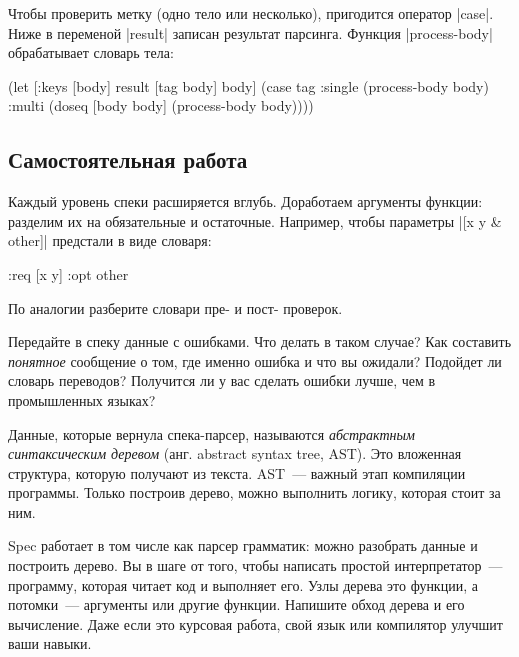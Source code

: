 Чтобы проверить метку (одно тело или несколько), пригодится оператор
\spverb|case|. Ниже в переменой \spverb|result| записан результат
парсинга. Функция \spverb|process-body| обрабатывает словарь тела:

\begin{english}
  \begin{clojure}
(let [{:keys [body]} result
      [tag body] body]
  (case tag
    :single
    (process-body body)
    :multi
    (doseq [body body]
      (process-body body))))
  \end{clojure}
\end{english}

\subsection{Самостоятельная работа}


Каждый уровень спеки расширяется вглубь. Доработаем аргументы функции: разделим
их на обязательные и остаточные. Например, чтобы параметры \spverb|[x y & other]|
предстали в виде словаря:

\begin{english}
  \begin{clojure}
{:req [x y] :opt other}
  \end{clojure}
\end{english}

\noindent
По аналогии разберите словари пре- и пост- проверок.

Передайте в спеку данные с ошибками. Что делать в таком случае? Как составить
\emph{понятное} сообщение о том, где именно ошибка и что вы ожидали? Подойдет ли
словарь переводов? Получится ли у вас сделать ошибки лучше, чем в промышленных
языках?

Данные, которые вернула спека-парсер, называются
\emph{абстрактным синтаксическим деревом}
(анг. abstract syntax tree, AST). Это вложенная структура, которую получают из
текста. AST~--- важный этап компиляции программы. Только построив дерево, можно
выполнить логику, которая стоит за ним.


Spec работает в том числе как парсер грамматик: можно разобрать данные и
построить дерево. Вы в шаге от того, чтобы написать простой интерпретатор~---
программу, которая читает код и выполняет его. Узлы дерева это функции, а
потомки~--- аргументы или другие функции. Напишите обход дерева и его
вычисление. Даже если это курсовая работа, свой язык или компилятор улучшит ваши
навыки.

